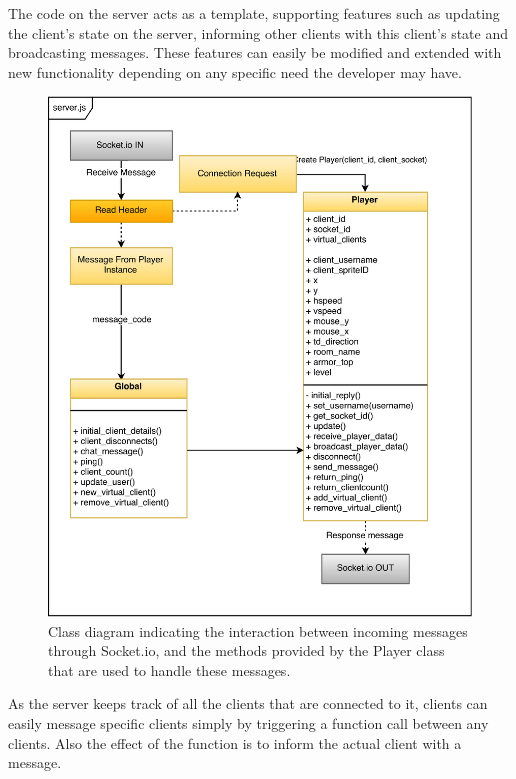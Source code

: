 \documentclass[bsc, 12pt, twoside, singlespacing, parskip, abbrevs, notimes, normalheadings, logo, deptreport]{styles/infthesis}
\begin{document}
The code on the server acts as a template, supporting features such as updating the client's state on the server, informing other clients with this client's state and broadcasting messages. These features can easily be modified and extended with new functionality depending on any specific need the developer may have.

\begin{figure}[H]
\includegraphics[scale=1]{images/server_class_diagram.eps}
\caption{Class diagram indicating the interaction between incoming messages through Socket.io, and the methods provided by the Player class that are used to handle these messages.}
\label{fig:server_class_diagram}
\vspace{1em}
\end{figure}

As the server keeps track of all the clients that are connected to it, clients can easily message specific clients simply by triggering a function call between any clients. Also the effect of the function is to inform the actual client with a message.
\end{document}
